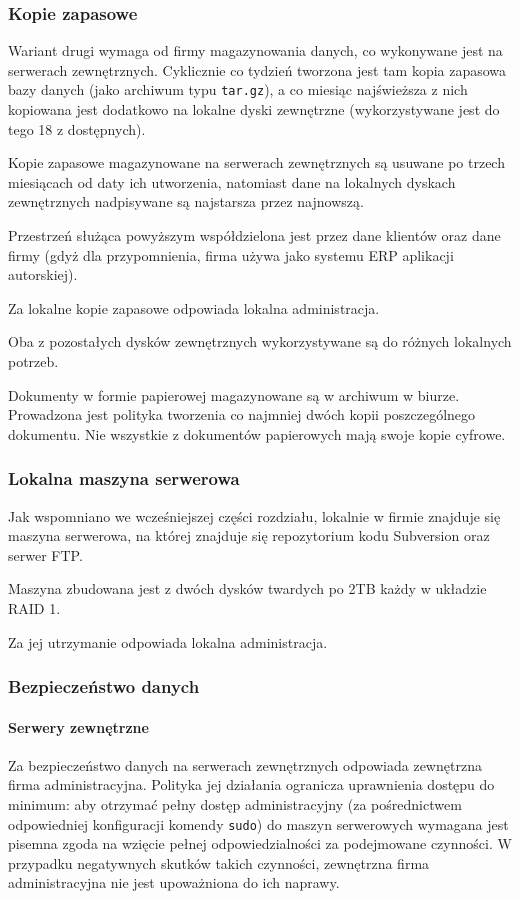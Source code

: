 \documentclass{article}
\begin{document}
            \subsubsection{Kopie zapasowe}
            Wariant drugi wymaga od firmy magazynowania danych, co wykonywane jest na serwerach zewnętrznych. Cyklicznie co tydzień tworzona jest tam kopia zapasowa bazy danych (jako archiwum typu \texttt{tar.gz}), a co miesiąc najświeższa z nich kopiowana jest dodatkowo na lokalne dyski zewnętrzne (wykorzystywane jest do tego 18 z dostępnych).

            Kopie zapasowe magazynowane na serwerach zewnętrznych są usuwane po trzech miesiącach od daty ich utworzenia, natomiast dane na lokalnych dyskach zewnętrznych nadpisywane są najstarsza przez najnowszą.

            Przestrzeń służąca powyższym współdzielona jest przez dane klientów oraz dane firmy (gdyż dla przypomnienia, firma używa jako systemu ERP aplikacji autorskiej).

            Za lokalne kopie zapasowe odpowiada lokalna administracja.

            Oba z pozostałych dysków zewnętrznych wykorzystywane są do różnych lokalnych potrzeb.

            Dokumenty w formie papierowej magazynowane są w archiwum w biurze. Prowadzona jest polityka tworzenia co najmniej dwóch kopii poszczególnego dokumentu. Nie wszystkie z dokumentów papierowych mają swoje kopie cyfrowe.

            \subsubsection{Lokalna maszyna serwerowa}
            Jak wspomniano we wcześniejszej części rozdziału, lokalnie w firmie znajduje się maszyna serwerowa, na której znajduje się repozytorium kodu Subversion oraz serwer FTP.

            Maszyna zbudowana jest z dwóch dysków twardych po 2TB każdy w układzie RAID 1.

            Za jej utrzymanie odpowiada lokalna administracja.

            \subsubsection{Bezpieczeństwo danych}
            \paragraph{Serwery zewnętrzne}
            Za bezpieczeństwo danych na serwerach zewnętrznych odpowiada zewnętrzna firma administracyjna. Polityka jej działania ogranicza uprawnienia dostępu do minimum: aby otrzymać pełny dostęp administracyjny (za pośrednictwem odpowiedniej konfiguracji komendy \texttt{sudo}) do maszyn serwerowych wymagana jest pisemna zgoda na wzięcie pełnej odpowiedzialności za podejmowane czynności. W przypadku negatywnych skutków takich czynności, zewnętrzna firma administracyjna nie jest upoważniona do ich naprawy.
\end{document}
